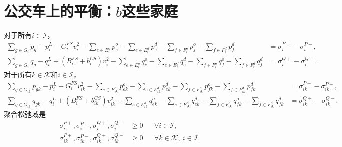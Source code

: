 \documentclass{article}
\begin{document}
\section*{公交车上的平衡：$b$这些家庭}
对于所有$i\in\mathcal I$，
\begin{equation}\tag{2.3}
\begin{aligned}
\sum_{g\in G_i}p_g-p_i^L-G_i^{FS}v_i^2
-\sum_{e\in E_i^o}p_e^o-\sum_{e\in E_i^d}p_e^d
-\sum_{f\in F_i^o}p_f^o-\sum_{f\in F_i^d}p_f^d
&=\sigma_i^{P+}-\sigma_i^{P-},\\
\sum_{g\in G_i}q_g-q_i^L+(B_i^{FS}+b_i^{CS})v_i^2
-\sum_{e\in E_i^o}q_e^o-\sum_{e\in E_i^d}q_e^d
-\sum_{f\in F_i^o}q_f^o-\sum_{f\in F_i^d}q_f^d
&=\sigma_i^{Q+}-\sigma_i^{Q-}.
\end{aligned}
\end{equation}
对于所有$k\in\mathcal K$和$i\in\mathcal I$，
\begin{align*}
\sum_{g\in G_{ik}}p_{gk}-p_i^L-G_i^{FS}v_{ik}^2
-\sum_{e\in E_{ik}^o}p_{ek}^o-\sum_{e\in E_{ik}^d}p_{ek}^d
-\sum_{f\in F_{ik}^o}p_{fk}^o-\sum_{f\in F_{ik}^d}p_{fk}^d
&=\sigma_{ik}^{P+}-\sigma_{ik}^{P-},\\
\sum_{g\in G_{ik}}q_{gk}-q_i^L+(B_i^{FS}+b_{ik}^{CS})v_{ik}^2
-\sum_{e\in E_{ik}^o}q_{ek}^o-\sum_{e\in E_{ik}^d}q_{ek}^d
-\sum_{f\in F_{ik}^o}q_{fk}^o-\sum_{f\in F_{ik}^d}q_{fk}^d
&=\sigma_{ik}^{Q+}-\sigma_{ik}^{Q-}.
\end{align*}
聚合松弛域是
\begin{align*}
\sigma_i^{P+},\sigma_i^{P-},\sigma_i^{Q+},\sigma_i^{Q-}&\geq0 &&\forall i\in\mathcal I,\\
\sigma_{ik}^{P+},\sigma_{ik}^{P-},\sigma_{ik}^{Q+},\sigma_{ik}^{Q-}&\geq0 &&\forall k\in\mathcal K,\ i\in\mathcal I.
\end{align*}
\end{document}
